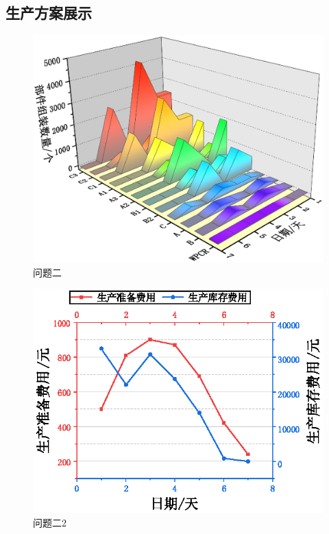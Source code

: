 \subsection{生产方案展示} %
\label{sub:生产方案展示}

\begin{figure}[!htbp]
	\centering
	\includegraphics{Image/问题二展示.eps}
	\caption{问题二}\label{问题二}
\end{figure}

\begin{figure}[!htbp]
	\centering
	\includegraphics{Image/问题二展示2.eps}
	\caption{问题二2}\label{问题二2}
\end{figure}


